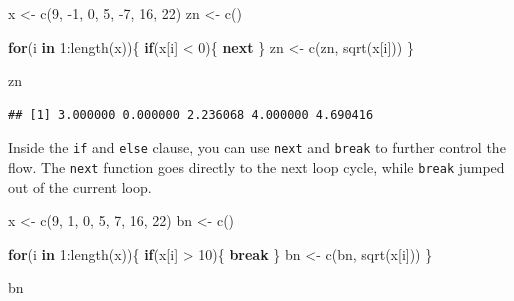 \documentclass[
]{book}
\newenvironment{Shaded}{\begin{snugshade}}{\end{snugshade}}
\newcommand{\ControlFlowTok}[1]{\textcolor[rgb]{0.13,0.29,0.53}{\textbf{#1}}}
\newcommand{\DecValTok}[1]{\textcolor[rgb]{0.00,0.00,0.81}{#1}}
\newcommand{\FunctionTok}[1]{\textcolor[rgb]{0.00,0.00,0.00}{#1}}
\newcommand{\NormalTok}[1]{#1}
\newcommand{\OtherTok}[1]{\textcolor[rgb]{0.56,0.35,0.01}{#1}}
\newcommand{\SpecialCharTok}[1]{\textcolor[rgb]{0.00,0.00,0.00}{#1}}
\begin{document}
\begin{Shaded}
\begin{Highlighting}[]
\NormalTok{x }\OtherTok{\textless{}{-}} \FunctionTok{c}\NormalTok{(}\DecValTok{9}\NormalTok{, }\SpecialCharTok{{-}}\DecValTok{1}\NormalTok{, }\DecValTok{0}\NormalTok{, }\DecValTok{5}\NormalTok{, }\SpecialCharTok{{-}}\DecValTok{7}\NormalTok{, }\DecValTok{16}\NormalTok{, }\DecValTok{22}\NormalTok{)}
\NormalTok{zn }\OtherTok{\textless{}{-}} \FunctionTok{c}\NormalTok{()}

\ControlFlowTok{for}\NormalTok{(i }\ControlFlowTok{in} \DecValTok{1}\SpecialCharTok{:}\FunctionTok{length}\NormalTok{(x))\{ }
  \ControlFlowTok{if}\NormalTok{(x[i] }\SpecialCharTok{\textless{}} \DecValTok{0}\NormalTok{)\{ }
    \ControlFlowTok{next}
\NormalTok{  \} }
\NormalTok{  zn }\OtherTok{\textless{}{-}} \FunctionTok{c}\NormalTok{(zn,  }\FunctionTok{sqrt}\NormalTok{(x[i]))}
\NormalTok{\}}

\NormalTok{zn}
\end{Highlighting}
\end{Shaded}

\begin{verbatim}
## [1] 3.000000 0.000000 2.236068 4.000000 4.690416
\end{verbatim}

Inside the \texttt{if} and \texttt{else} clause, you can use \texttt{next} and \texttt{break} to further control the flow. The \texttt{next} function goes directly to the next loop cycle, while \texttt{break} jumped out of the current loop.

\begin{Shaded}
\begin{Highlighting}[]
\NormalTok{x }\OtherTok{\textless{}{-}} \FunctionTok{c}\NormalTok{(}\DecValTok{9}\NormalTok{, }\DecValTok{1}\NormalTok{, }\DecValTok{0}\NormalTok{, }\DecValTok{5}\NormalTok{, }\DecValTok{7}\NormalTok{, }\DecValTok{16}\NormalTok{, }\DecValTok{22}\NormalTok{)}
\NormalTok{bn }\OtherTok{\textless{}{-}} \FunctionTok{c}\NormalTok{()}

\ControlFlowTok{for}\NormalTok{(i }\ControlFlowTok{in} \DecValTok{1}\SpecialCharTok{:}\FunctionTok{length}\NormalTok{(x))\{ }
  \ControlFlowTok{if}\NormalTok{(x[i] }\SpecialCharTok{\textgreater{}} \DecValTok{10}\NormalTok{)\{ }
    \ControlFlowTok{break}
\NormalTok{  \} }
\NormalTok{  bn }\OtherTok{\textless{}{-}} \FunctionTok{c}\NormalTok{(bn,  }\FunctionTok{sqrt}\NormalTok{(x[i]))}
\NormalTok{\}}

\NormalTok{bn}
\end{Highlighting}
\end{Shaded}
\end{document}
